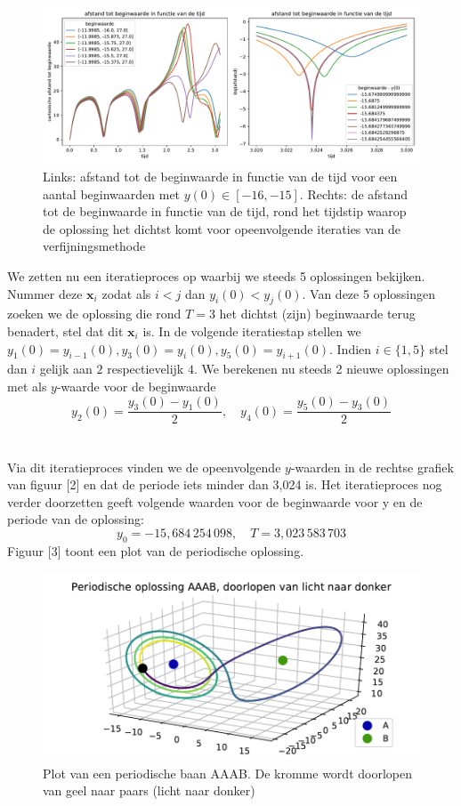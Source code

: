 \documentclass[12pt, a4paper]{article}
\newcommand{\x}{\textbf{x}}
\theoremstyle{definition}
\begin{document}
\begin{figure}[h]
    \centering
    \includegraphics[width=\linewidth]{afstand_beginwaarde_opdracht4.pdf}
    \caption{Links: afstand tot de beginwaarde in functie van de tijd voor een aantal beginwaarden met $y(0) \in [-16, -15]$. Rechts: de afstand tot de beginwaarde in functie van de tijd, rond het tijdstip waarop de oplossing het dichtst komt voor opeenvolgende iteraties van de verfijningsmethode}
    \label{fig: afstand}
\end{figure}

 We zetten nu een iteratieproces op waarbij we steeds 5 oplossingen bekijken. Nummer deze $\x_i$ zodat als $i<j$ dan $y_i(0) < y_j(0)$. Van deze 5 oplossingen zoeken we de oplossing die rond $T=3$ het dichtst (zijn) beginwaarde terug benadert, stel dat dit $\x_i$ is. In de volgende iteratiestap stellen we $y_1(0) = y_{i-1}(0), y_3(0) = y_i(0), y_5(0)=y_{i+1}(0)$. Indien $i \in \{1,5\}$ stel dan $i$ gelijk aan $2$ respectievelijk $4$. We berekenen nu steeds 2 nieuwe oplossingen met als $y$-waarde voor de beginwaarde $$y_2(0) = \frac{y_3(0)-y_1(0)}{2}, \quad y_4(0) = \frac{y_5(0)-y_3(0)}{2}$$\\
\\
Via dit iteratieproces vinden we de opeenvolgende $y$-waarden in de rechtse grafiek van figuur [2] en dat de periode iets minder dan 3,024 is. Het iteratieproces nog verder doorzetten geeft volgende waarden voor de beginwaarde voor y en de periode van de oplossing:
$$y_0 = -15,684\, 254 \, 098 , \quad T=3,023 \, 583 \, 703$$
Figuur [3] toont een plot van de periodische oplossing.

\begin{figure}[h]
    \centering
    \includegraphics[width=0.8\linewidth]{periodische_baan_AAAB_opdracht4.pdf}
    \caption{Plot van een periodische baan AAAB. De kromme wordt doorlopen van geel naar paars (licht naar donker)}
    \label{fig: AAAB}
\end{figure}
\end{document}
